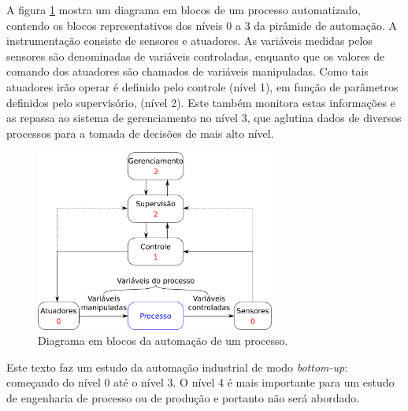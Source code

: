 A figura \ref{fig:automacao} mostra um diagrama em blocos de um processo automatizado, contendo os blocos representativos dos níveis 0 a 3 da pirâmide de automação. A instrumentação consiste de sensores e atuadores. As variáveis medidas pelos sensores são denominadas de variáveis controladas, enquanto que os valores de comando dos atuadores são chamados de variáveis manipuladas. Como tais atuadores irão operar é definido pelo controle (nível 1), em função de parâmetros definidos pelo supervisório, (nível 2). Este também monitora estas informações e as repassa ao sistema de gerenciamento no nível 3, que aglutina dados de diversos processos para a tomada de decisões de mais alto nível.
\begin{figure}[htb]
	\begin{center}
    \includegraphics[width=0.7\textwidth]{figuras/automacao}
	\end{center}
	\caption{Diagrama em blocos da automação de um processo.}
	\label{fig:automacao}
\end{figure}

Este texto faz um estudo da automação industrial de modo \emph{bottom-up}: começando do nível 0 até o nível 3. O nível 4 é mais importante para um estudo de engenharia de processo ou de produção e portanto não será abordado.
